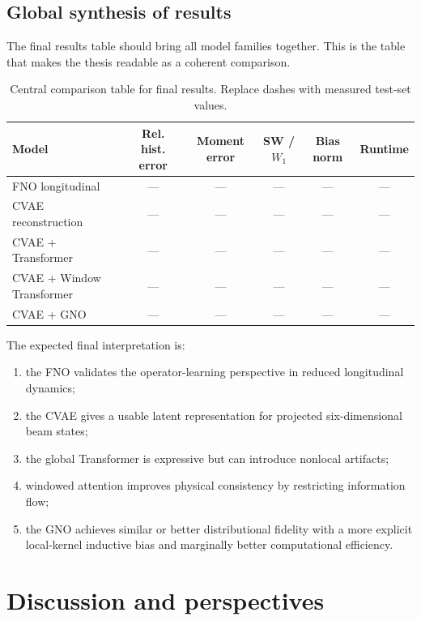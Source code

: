 \documentclass[11pt,a4paper]{article}
\begin{document}
\begin{sloppypar}
\subsection{Global synthesis of results}
The final results table should bring all model families together. This is the table that makes the thesis readable as a coherent comparison.

\begin{table}[H]
\centering
\caption{Central comparison table for final results. Replace dashes with measured test-set values.}
\label{tab:central_results_v2}
\begin{tabular}{lccccc}
\toprule
Model & Rel. hist. error & Moment error & SW / $W_1$ & Bias norm & Runtime \\
\midrule
FNO longitudinal & --- & --- & --- & --- & --- \\
CVAE reconstruction & --- & --- & --- & --- & --- \\
CVAE + Transformer & --- & --- & --- & --- & --- \\
CVAE + Window Transformer & --- & --- & --- & --- & --- \\
CVAE + GNO & --- & --- & --- & --- & --- \\
\bottomrule
\end{tabular}
\end{table}

The expected final interpretation is:
\begin{enumerate}[label=(\roman*)]
    \item the FNO validates the operator-learning perspective in reduced longitudinal dynamics;
    \item the CVAE gives a usable latent representation for projected six-dimensional beam states;
    \item the global Transformer is expressive but can introduce nonlocal artifacts;
    \item windowed attention improves physical consistency by restricting information flow;
    \item the GNO achieves similar or better distributional fidelity with a more explicit local-kernel inductive bias and marginally better computational efficiency.
\end{enumerate}

\section{Discussion and perspectives}
\label{sec:discussion}


\end{sloppypar}
\end{document}
